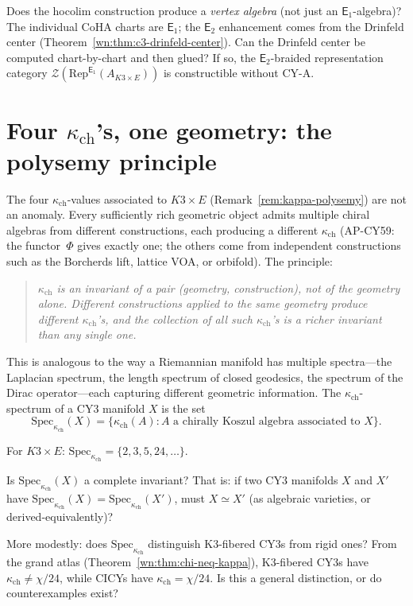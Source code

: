 \documentclass[11pt]{article}
\newcommand{\cZ}{\mathcal{Z}}
\newcommand{\Eone}{\mathsf{E}_1}
\newcommand{\Etwo}{\mathsf{E}_2}
\newcommand{\Rep}{\mathrm{Rep}}
\begin{document}
\begin{question}
Does the hocolim construction produce a \emph{vertex algebra} (not just an $\Eone$-algebra)? The individual CoHA charts are $\Eone$; the $\Etwo$ enhancement comes from the Drinfeld center (Theorem~\ref{wn:thm:c3-drinfeld-center}). Can the Drinfeld center be computed chart-by-chart and then glued? If so, the $\Etwo$-braided representation category $\cZ(\Rep^{\Eone}(A_{K3 \times E}))$ is constructible without CY-A.
\end{question}


\section{Four $\kappa_{\mathrm{ch}}$'s, one geometry: the polysemy principle}
\label{sec:motivic-four-kappas}

The four $\kappa_{\mathrm{ch}}$-values associated to $K3 \times E$ (Remark~\ref{rem:kappa-polysemy}) are not an anomaly. Every sufficiently rich geometric object admits multiple chiral algebras from different constructions, each producing a different $\kappa_{\mathrm{ch}}$ (AP-CY59: the functor~$\Phi$ gives exactly one; the others come from independent constructions such as the Borcherds lift, lattice VOA, or orbifold). The principle:

\begin{quote}
\emph{$\kappa_{\mathrm{ch}}$ is an invariant of a pair (geometry, construction), not of the geometry alone. Different constructions applied to the same geometry produce different $\kappa_{\mathrm{ch}}$'s, and the collection of all such $\kappa_{\mathrm{ch}}$'s is a richer invariant than any single one.}
\end{quote}

This is analogous to the way a Riemannian manifold has multiple spectra---the Laplacian spectrum, the length spectrum of closed geodesics, the spectrum of the Dirac operator---each capturing different geometric information. The $\kappa_{\mathrm{ch}}$-spectrum of a CY3 manifold $X$ is the set
\[
 \mathrm{Spec}_{\kappa_{\mathrm{ch}}}(X) = \bigl\{ \kappa_{\mathrm{ch}}(A) : A \text{ a chirally Koszul algebra associated to } X \bigr\}.
\]

For $K3 \times E$: $\mathrm{Spec}_{\kappa_{\mathrm{ch}}} = \{2, 3, 5, 24, \ldots\}$.

\begin{question}
Is $\mathrm{Spec}_{\kappa_{\mathrm{ch}}}(X)$ a complete invariant? That is: if two CY3 manifolds $X$ and $X'$ have $\mathrm{Spec}_{\kappa_{\mathrm{ch}}}(X) = \mathrm{Spec}_{\kappa_{\mathrm{ch}}}(X')$, must $X \simeq X'$ (as algebraic varieties, or derived-equivalently)?

More modestly: does $\mathrm{Spec}_{\kappa_{\mathrm{ch}}}$ distinguish K3-fibered CY3s from rigid ones? From the grand atlas (Theorem~\ref{wn:thm:chi-neq-kappa}), K3-fibered CY3s have $\kappa_{\mathrm{ch}} \neq \chi/24$, while CICYs have $\kappa_{\mathrm{ch}} = \chi/24$. Is this a general distinction, or do counterexamples exist?
\end{question}
\end{document}
